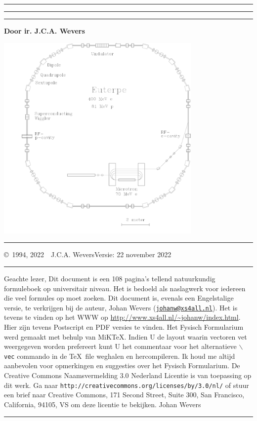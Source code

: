 \documentclass[twoside]{report}
\makeatletter
\newlength{\@x}
\makeatother
\begin{document}
\thispagestyle{empty}
\setcounter{page}{0}
\hrule
\rule{.4pt}{22.85cm}\hspace*{154mm}\rule{.4pt}{22.85cm}
\vspace*{-18cm}
\begin{center}
\Huge
{}
\end{center}
\vspace{2cm}
\centerline{\Large\bf Door ir. J.C.A. Wevers}
\vspace{2cm}
\centerline{\includegraphics[width=10cm]{euterpe.pdf}~~~~~~}
\vfill
\hrule
\newpage
\thispagestyle{empty}
\copyright~1994, 2022~~J.C.A. Wevers\hfill Versie: 22 november 2022
\npar
\hrule
\par
\bigskip
Geachte lezer,
\npar
Dit document is een 108 pagina's tellend natuurkundig formuleboek op
universitair niveau. Het is bedoeld als naslagwerk voor iedereen die veel
formules op moet zoeken.
\npar
Dit document is, evenals een Engelstalige versie, te verkrijgen bij de
auteur, Johan Wevers\linebreak
(\href{mailto:johanw@xs4all.nl}{\tt johanw@xs4all.nl}).
\npar
Het is tevens te vinden op het WWW op \url{http://www.xs4all.nl/~johanw/index.html}.
Hier zijn tevens Postscript en PDF versies te vinden.
\npar
Het Fysisch Formularium werd gemaakt met behulp van MiK\TeX.
\npar
Indien U de layout waarin vectoren vet weergegeven worden prefereert kunt U
het commentaar voor het alternatieve {\tt $\backslash$vec} commando in de
\TeX\ file weghalen en hercompileren.
\npar
Ik houd me altijd aanbevolen voor opmerkingen en suggesties over het Fysisch
Formularium.
\npar
De Creative Commons Naamsvermelding 3.0 Nederland Licentie is van toepassing op dit werk.
Ga naar {\tt http://creativecommons.org/licenses/by/3.0/nl/} of stuur een brief naar Creative Commons,
171 Second Street, Suite 300, San Francisco, California, 94105, VS om deze licentie te bekijken.
\npar
Johan Wevers
\vfill
\hrule
\newpage
\end{document}
